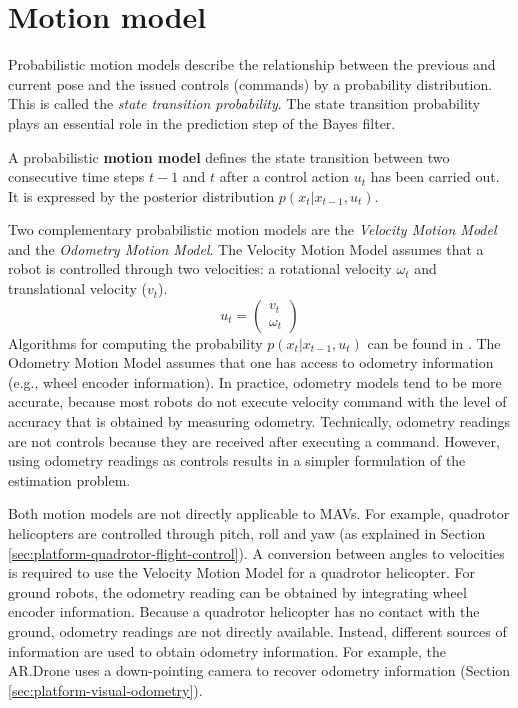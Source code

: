 		\section{Motion model}
		\label{sec:motion_model}
Probabilistic motion models describe the relationship between the previous and current pose and the issued controls (commands) by a probability distribution. This is called the \textit{state transition probability}.
The state transition probability plays an essential role in the prediction step of the Bayes filter.
\begin{mydef}
A probabilistic \textbf{motion model} defines the state transition between two consecutive time steps $t-1$ and $t$ after a control action $u_{t}$ has been carried out. It is expressed by the posterior distribution $p (x_t | x_{t-1}, u_{t})$.
\end{mydef}

Two complementary probabilistic motion models are the \textit{Velocity Motion Model} and the \textit{Odometry Motion Model}.
The Velocity Motion Model assumes that a robot is controlled through two velocities: a rotational velocity $\omega_t$ and translational velocity ($v_t$).
\begin{equation}
u_t = 
\left( \begin{array}{c}
v_t \\
\omega_t \end{array} \right)
\end{equation}
Algorithms for computing the probability $p (x_t | x_{t-1}, u_{t})$ can be found in \cite{fox2005probabilistic}.
The Odometry Motion Model assumes that one has access to odometry information (e.g., wheel encoder information).
In practice, odometry models tend to be more accurate, because most robots do not execute velocity command with the level of accuracy that is obtained by measuring odometry.
Technically, odometry readings are not controls because they are received after executing a command.
However, using odometry readings as controls results in a simpler formulation of the estimation problem.

Both motion models are not directly applicable to MAVs.
For example, quadrotor helicopters are controlled through pitch, roll and yaw (as explained in Section \ref{sec:platform-quadrotor-flight-control}).
A conversion between angles to velocities is required to use the Velocity Motion Model for a quadrotor helicopter.
For ground robots, the odometry reading can be obtained by integrating wheel encoder information.
Because a quadrotor helicopter has no contact with the ground, odometry readings are not directly available.
Instead, different sources of information are used to obtain odometry information.
For example, the AR.Drone uses a down-pointing camera to recover odometry information (Section \ref{sec:platform-visual-odometry}).


